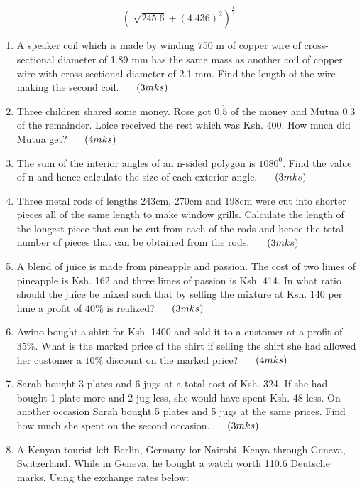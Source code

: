 \documentclass[
  a4paperpaper,
]{scrbook}
\begin{document}
\begin{tcolorbox}
\[\left(\sqrt[]{245.6}+(4.436)^2\right)^\frac{1}{2}\]

\begin{enumerate}
\def\labelenumi{\arabic{enumi}.}
\setcounter{enumi}{6}
\item
  A speaker coil which is made by winding 750 m of copper wire of
  cross-sectional diameter of 1.89 mm has the same mass as another coil
  of copper wire with cross-sectional diameter of 2.1 mm. Find the
  length of the wire making the second coil. \(\hspace{0.5cm} (3mks)\)
\item
  Three children shared some money. Rose got \(0.\dot{5}\) of the money
  and Mutua \(0.\dot3\) of the remainder. Loice received the rest which
  was Ksh. 400. How much did Mutua get? \(\hspace{0.5cm} (4mks)\)
\item
  The sum of the interior angles of an n-sided polygon is \(1080^0\).
  Find the value of n and hence calculate the size of each exterior
  angle. \(\hspace{0.5cm} (3mks)\)
\item
  Three metal rods of lengths 243cm, 270cm and 198cm were cut into
  shorter pieces all of the same length to make window grills. Calculate
  the length of the longest piece that can be cut from each of the rods
  and hence the total number of pieces that can be obtained from the
  rods. \(\hspace{0.5cm} (3mks)\)
\item
  A blend of juice is made from pineapple and passion. The cost of two
  limes of pineapple is Ksh. 162 and three limes of passion is Ksh. 414.
  In what ratio should the juice be mixed such that by selling the
  mixture at Ksh. 140 per lime a profit of \(40\%\) is realized?
  \(\hspace{0.5cm} (3mks)\)
\item
  Awino bought a shirt for Ksh. 1400 and sold it to a customer at a
  profit of \(35\%\). What is the marked price of the shirt if selling
  the shirt she had allowed her customer a \(10\%\) discount on the
  marked price? \(\hspace{0.5cm}(4mks)\)
\item
  Sarah bought 3 plates and 6 jugs at a total cost of Ksh. 324. If she
  had bought 1 plate more and 2 jug less, she would have spent Ksh. 48
  less. On another occasion Sarah bought 5 plates and 5 jugs at the same
  prices. Find how much she spent on the second occasion.
  \(\hspace{0.5cm} (3mks)\)
\item
  A Kenyan tourist left Berlin, Germany for Nairobi, Kenya through
  Geneva, Switzerland. While in Geneva, he bought a watch worth 110.6
  Deutsche marks. Using the exchange rates below:
\end{enumerate}


\end{tcolorbox}
\end{document}
